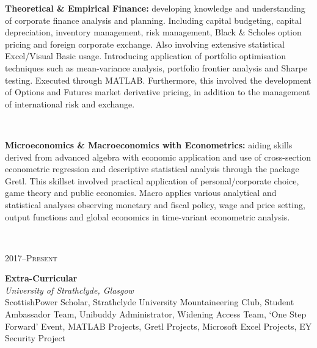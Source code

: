\documentclass[11pt, english]{article}
\begin{document}
{\begin{minipage}[t]{.15\linewidth}
        \hfill 
        \textsc{}
\end{minipage}
\hfill\vline\hfill
\begin{minipage}[t]{.80\linewidth}
	\textbf{Theoretical \& Empirical Finance:} developing knowledge and understanding of corporate finance analysis and planning. Including capital budgeting, capital depreciation, inventory management, risk management, Black \& Scholes option pricing and foreign corporate exchange. Also involving extensive statistical Excel/Visual Basic usage. Introducing application of portfolio optimisation techniques such as mean-variance analysis, portfolio frontier analysis and Sharpe testing. Executed through MATLAB. Furthermore, this involved the development of Options and Futures market derivative pricing, in addition to the management of international risk and exchange.
\end{minipage}\\

\begin{minipage}[t]{.15\linewidth}
	\hfill 
        \textsc{}
\end{minipage}
\hfill\vline\hfill
\begin{minipage}[t]{.80\linewidth}
	\textbf{Microeconomics \& Macroeconomics with Econometrics:} aiding skills derived from advanced algebra with economic application and use of cross-section econometric regression and descriptive statistical analysis through the package Gretl. This skillset involved practical application of personal/corporate choice, game theory and public economics. Macro applies various analytical and statistical analyses observing monetary and fiscal policy, wage and price setting, output functions and global economics in time-variant econometric analysis.
\end{minipage}\\
\vspace{0.25cm} 

\begin{minipage}[t]{.15\linewidth}
        \hfill             
        \textsc{2017--Present}
\end{minipage}                    
\hfill\vline\hfill
\begin{minipage}[t]{.80\linewidth}
	\textbf{Extra-Curricular}\\            
        \textit{University of Strathclyde, Glasgow}\\
	ScottishPower Scholar, Strathclyde University Mountaineering Club, Student Ambassador Team, Unibuddy Administrator, Widening Access Team, `One Step Forward' Event, MATLAB Projects, Gretl Projects, Microsoft Excel Projects, EY Security Project
\end{minipage}\\
\vspace{0.25cm}

}
\end{document}

